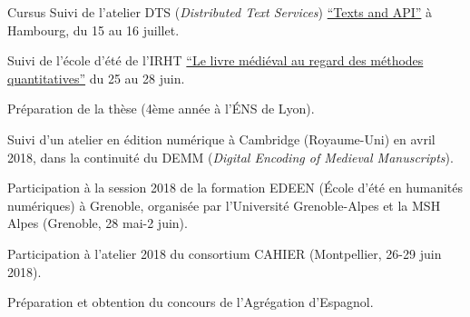 \begin{rubric}{Cursus}
                                \entry*
                            Suivi de l'atelier DTS (\textit{Distributed Text
                        Services}) \href{https://distributed-text-services.github.io/workshops/events/2019-hamburg/}{\enquote{Texts and API}} à Hambourg, du 15 au 16
                        juillet.
                    
                                \entry*
                            Suivi de l'école d'été de l'IRHT \href{https://www.irht.cnrs.fr/?q=fr/agenda/le-livre-medieval-au-regard-des-methodes-quantitatives-0}{\enquote{Le livre médiéval au regard des méthodes
                        quantitatives}} du 25 au 28 juin.
                    
                                \entry*[2017-2018]
                            Préparation de la thèse (4ème année à l'ÉNS de
                        Lyon). 
                    
                                \entry*
                            Suivi d'un atelier en édition numérique à
                        Cambridge (Royaume-Uni) en avril 2018, dans la
                        continuité du DEMM (\textit{Digital Encoding of Medieval
                        Manuscripts}).
                    
                                \entry*
                            Participation à la session 2018 de la formation
                        EDEEN (École d'été en humanités numériques) à Grenoble,
                        organisée par l'Université Grenoble-Alpes et la MSH
                        Alpes (Grenoble, 28 mai-2 juin).
                    
                                \entry*
                            Participation à l'atelier 2018 du consortium
                        CAHIER (Montpellier, 26-29 juin 2018).
                    
                                \entry*[2016-2017]
                            Préparation et obtention du concours de
                        l'Agrégation d'Espagnol. 
                    

\end{rubric}
